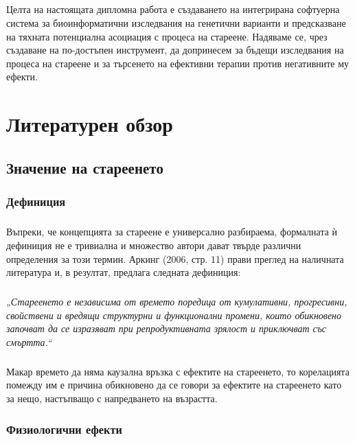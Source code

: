 \documentclass[pdftex,cyrillic,14pt,a4page,twoside]{extreport}
\begin{document}
\paragraph{}
Целта на настоящата дипломна работа е създаването на интегрирана софтуерна система за биоинформатични изследвания на генетични варианти и предсказване на тяхната потенциална асоциация с процеса на стареене. Надяваме се, чрез създаване на по-достъпен инструмент, да допринесем за бъдещи изследвания на процеса на стареене и за търсенето на ефективни терапии против негативните му ефекти.
            
\chapter{Литературен обзор}
\section{Значение на стареенето}
\subsection{Дефиниция}
\paragraph{}
Въпреки, че концепцията за стареене е универсално разбираема, формалната ѝ дефиниция не е тривиална и множество автори дават твърде различни определения за този термин. Аркинг (2006, стр. 11) прави преглед на наличната литература и, в резултат, предлага следната дефиниция\cite{arking2006biology}:

\paragraph{}
\textit{„Стареенето е независима от времето поредица от кумулативни, прогресивни, свойствени и вредящи структурни и функционални промени, които обикновено започват да се изразяват при репродуктивната зрялост и приключват със смъртта.“}

\paragraph{}
Макар времето да няма каузална връзка с ефектите на стареенето, то корелацията помежду им е причина обикновено да се говори за ефектите на стареенето като за нещо, настъпващо с напредването на възрастта.

\subsection{Физиологични ефекти}
\end{document}
